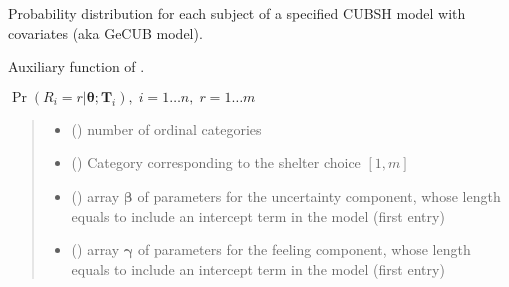 \documentclass[letterpaper,10pt,english]{sphinxmanual}
\begin{document}
\begin{fulllineitems}
\label{\detokenize{cubmods:cubmods.cubsh_ywx.pmfi}}
\pysigstartsignatures
{}
\pysigstopsignatures
\sphinxAtStartPar
Probability distribution for each subject of a specified CUBSH model with covariates
(aka GeCUB model).

\sphinxAtStartPar
Auxiliary function of .

\sphinxAtStartPar
\(\Pr(R_i=r|\pmb\theta; \pmb T_i),\; i=1 \ldots n ,\; r=1 \ldots m\)
\begin{quote}\begin{description}
\begin{itemize}
\item {} 
\sphinxAtStartPar
{} () \textendash{} number of ordinal categories

\item {} 
\sphinxAtStartPar
{} () \textendash{} Category corresponding to the shelter choice \([1,m]\)

\item {} 
\sphinxAtStartPar
{} () \textendash{} array \(\pmb \beta\) of parameters for the uncertainty component, whose length equals 
 to include an intercept term in the model (first entry)

\item {} 
\sphinxAtStartPar
{} () \textendash{} array \(\pmb \gamma\) of parameters for the feeling component, whose length equals 
 to include an intercept term in the model (first entry)


\end{itemize}
\end{description}
\end{quote}
\end{fulllineitems}
\end{document}
